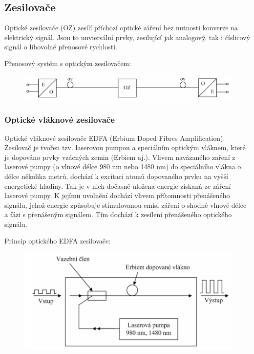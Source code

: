 \subsection{Zesilovače}
Optické zesilovače (OZ) zesílí příchozí optické záření bez nutnosti konverze na elektrický signál. Jsou to unviersální prvky, zesilující jak analogový, tak i číslicový signál o libovolné přenosové rychlosti. 

Přenosový systém s optickým zesilovačem:
\begin{figure}[!ht]
\begin{center}
    \includegraphics[scale=1]{obrazky/zesil.png}
  \end{center}
\end{figure}

\subsubsection{Optické vláknové zesilovače}
Optické vláknové zesilovače EDFA (Erbium Doped Fibres Amplification). Zesilovač je tvořen tzv. laserovou pumpou a speciálním optickým vláknem, které je dopováno prvky vzácných zemin (Erbiem aj.). Vlivem navázaného zaření z laserové pumpy (o vlnové délce 980 nm nebo 1480 nm) do speciálního vlákna o délce několika metrů, dochází k excitaci atomů dopovaného prvku na vyšší energetické hladiny. Tak je v nich dočasně uložena energie získaná ze záření laserové pumpy. K jejímu uvolnění dochází vlivem přítomnosti přenášeného signálu, jehož energie způsobuje stimulovanou emisi záření o shodné vlnové délce a fázi s přenášeným signálem. Tím dochází k zesílení přenášeného optického signálu. \newpage

Princip optického EDFA zesilovače:
\begin{figure}[!ht]
\begin{center}
    \includegraphics[scale=1]{obrazky/EDFA.png}
  \end{center}
\end{figure}


